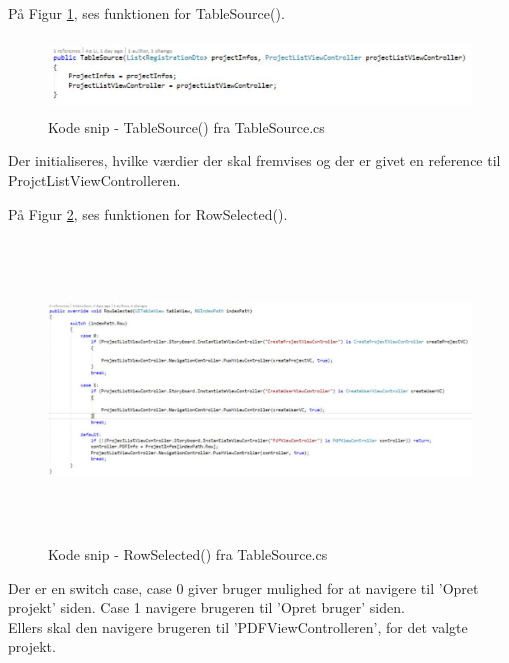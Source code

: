 På Figur \ref{fig:TableSource}, ses funktionen for TableSource().
\begin{figure}[H] %
	\centering
	\includegraphics[height=2cm, width=15cm]{../ArkitekturDesign/Design/ProjectList/TableSource}
	\caption{Kode snip - TableSource() fra TableSource.cs}
	\label{fig:TableSource}
\end{figure}
Der initialiseres, hvilke værdier der skal fremvises og der er givet en reference til ProjctListViewControlleren.

På Figur \ref{fig:RowSelection}, ses funktionen for RowSelected().
\begin{figure}[H] %
	\centering
	\includegraphics[height=8cm, width=17cm]{../ArkitekturDesign/Design/ProjectList/RowSelection}
	\caption{Kode snip - RowSelected() fra TableSource.cs}
	\label{fig:RowSelection}
\end{figure}
Der er en switch case, case 0 giver bruger mulighed for at navigere til 'Opret projekt' siden. Case 1 navigere brugeren til 'Opret bruger' siden. \\
Ellers skal den navigere brugeren til 'PDFViewControlleren', for det valgte projekt.

\clearpage
